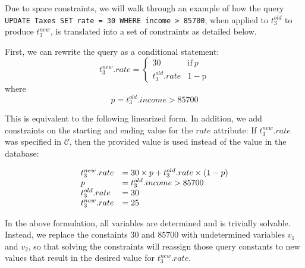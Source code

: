 
Due to space constraints, we will walk through an example of how the query
\texttt{UPDATE Taxes SET rate = 30 WHERE income > 85700}, when applied to 
$t_3^{old}$ to produce $t_3^{new}$, is translated into a set of constraints
as detailed below.

First, we can rewrite the query as a conditional statement:
\[
t_3^{new}.rate = \begin{cases}
				  30              & \mathrm{if}\ p  \\
                  t_3^{old}.rate  & \mathrm{1-p}
               \end{cases}
\]
where \[p = t_3^{old}.income > 85700\]

This is equivalent to the following linearized form.
In addition, we add constraints on the starting and ending value for the $rate$ attribute:
If $t_3^{new}.rate$ was specified in $\mathcal{C}$, then the provided value
is used instead of the value in the database:

\[
\begin{array}{l l l}
t_3^{new}.rate &= 30\times p + t_3^{old}.rate\times (1-p)\\
p              &= t_3^{old}.income > 85700\\
t_3^{old}.rate &= 30 \\
t_3^{new}.rate &= 25
\end{array}
\]

In the above formulation, all variables are determined and is trivially
solvable.  Instead, we replace
the constaints $30$ and $85700$ with undetermined variables $v_1$ and $v_2$,
so that solving the constraints will reassign those query constants 
to new values that result in the desired value for $t_3^{new}.rate$. 
\iffalse
\[
\begin{array}{l l l}
t_3^{new}.rate &= v_1\times p + t_3^{old}.rate\times (1-p)\\
p              &= t_3^{old}.income > v_2\\
t_3^{old}.rate &= 30 \\
t_3^{new}.rate &= 25 \\
v_1            &\in [minval, maxval]\\
v_2            &\in [minval, maxval]\\
\end{array}
\]
\fi